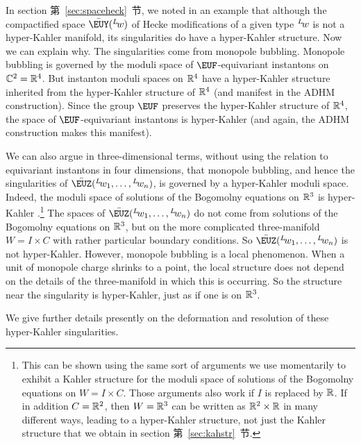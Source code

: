 \par{}

In section 第~\ref{sec:spaceheck}~节, we noted in an example that although the
compactified space $\bar {{\EUY}}(^L\negthinspace w)$ of Hecke
modifications of a given type $^L\negthinspace w$ is not a
hyper-Kahler manifold, its singularities do have a hyper-Kahler
structure.  Now we can explain why.  The singularities come from
monopole bubbling. Monopole bubbling is governed by the moduli
space of ${\EUF}$-equivariant instantons on $\Bbb{C}^2=\Bbb{R}^4$.
But instanton moduli spaces on $\Bbb{R}^4$ have a hyper-Kahler
structure inherited from the hyper-Kahler structure of $\Bbb{R}^4$
(and manifest in the ADHM construction).  Since the group ${\EUF}$
preserves the hyper-Kahler structure of $\Bbb{R}^4$, the space of
${\EUF}$-equivariant instantons is hyper-Kahler (and again, the
ADHM construction makes this manifest).

 We can also  argue in three-dimensional
terms, without using the relation to equivariant instantons in
four dimensions, that monopole bubbling, and hence the
singularities of $\bar {{\EUZ}}({}^L\negthinspace
w_1,\dots,{}^L\negthinspace w_n)$, is governed by a hyper-Kahler
moduli space. Indeed, the moduli space of solutions of the
Bogomolny equations on $\Bbb{R}^3$ is hyper-Kahler
\cite{ref109}.\footnote{This can be shown using the same sort of arguments
we use momentarily to exhibit a Kahler structure for the moduli
space of solutions of the Bogomolny equations on $W=I\times C$.
Those arguments also work if $I$ is replaced by $\Bbb{R}$. If in
addition $C=\Bbb{R}^2$, then $W=\Bbb{R}^3$ can be written as
$\Bbb{R}^2\times \Bbb{R}$ in many different ways, leading to a
hyper-Kahler structure, not just the Kahler structure that we
obtain in section 第~\ref{sec:kahstr}~节. } The spaces of $\bar
{{\EUZ}}({}^L\negthinspace w_1,\dots,{}^L\negthinspace w_n)$ do
not come  from solutions of the Bogomolny equations on
$\Bbb{R}^3$, but on the more complicated three-manifold $W=I
\times C$ with rather particular boundary conditions. So $\bar
{{\EUZ}}({}^L\negthinspace w_1,\dots,{}^L\negthinspace w_n)$ is
not hyper-Kahler. However, monopole bubbling is a local
phenomenon. When a unit of monopole charge shrinks to a point, the
local structure does not depend on the details of the
three-manifold in which this is occurring.  So the structure near
the singularity is hyper-Kahler, just as if one is on $\Bbb{R}^3$.

We give further details presently on the deformation and
resolution of these hyper-Kahler singularities.
